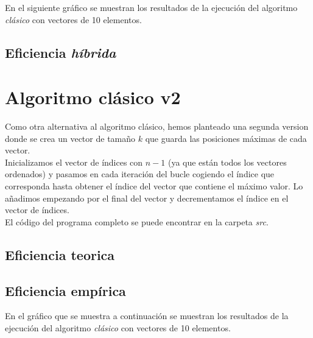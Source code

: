 \documentclass[11pt]{article}
\begin{document}
En el siguiente gráfico se muestran los resultados de la
ejecución del algoritmo \textit{clásico} con vectores de 10 elementos.

\begin{center}
	
\end{center}

\subsection*{Eficiencia \textit{híbrida}}

\section*{Algoritmo clásico v2}
 
 Como otra alternativa al algoritmo clásico, hemos planteado una segunda version donde se crea un vector de tamaño $k$ que guarda las posiciones máximas de cada vector. \\
 
 Inicializamos el vector de índices con $n - 1$ (ya que están todos los vectores ordenados) y pasamos en cada iteración del bucle cogiendo el índice que corresponda hasta obtener el índice del vector que contiene el máximo valor. Lo añadimos empezando por el final del vector y decrementamos el índice en el vector de índices. \\
 
 El código del programa completo se puede encontrar en la carpeta \textit{src}.
 
 
 
 \subsection*{Eficiencia teorica}
 
 \subsection*{Eficiencia empírica}
 
 En el gráfico que se muestra a continuación se muestran los resultados de la
 ejecución del algoritmo \textit{clásico} con vectores de 10 elementos.
 
 \begin{center}
 	
 \end{center}
    
\end{document}
